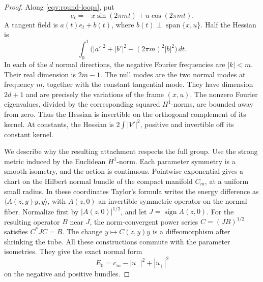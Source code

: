 \begin{proof}
Along \eqref{eqv:round-loops}, put
\[
 e_t=-x\sin(2\pi mt)+u\cos(2\pi mt).
\]
A tangent field is \(a(t)e_t+b(t)\), where
\(b(t)\perp\operatorname{span}\{x,u\}\).
Half the Hessian is
\begin{equation}
 \int_0^1\bigl(|a'|^2+|b'|^2-(2\pi m)^2|b|^2\bigr)\,dt.
 \label{eqv:round-hessian}
\end{equation}
In each of the \(d\) normal directions, the negative Fourier
frequencies are \(|k|<m\).  Their real dimension is \(2m-1\).
The null modes are the two normal modes at frequency \(m\), together
with the constant tangential mode.  They have dimension \(2d+1\)
and are precisely the variations of the frame \((x,u)\).
The nonzero Fourier eigenvalues, divided by the corresponding squared
\(H^1\)-norms, are bounded away from zero.  Thus the Hessian is
invertible on the orthogonal complement of its kernel.
At constants, the Hessian is \(2\int|V'|^2\), positive and invertible
off its constant kernel.

We describe why the resulting attachment respects the full group.
Use the strong metric induced by the Euclidean \(H^1\)-norm.
Each parameter symmetry is a smooth isometry, and the action is
continuous.  Pointwise exponential gives a chart on the Hilbert
normal bundle of the compact manifold \(C_m\), at a uniform small
radius.  In these coordinates Taylor's formula writes the energy
difference as \(\langle A(z,y)y,y\rangle\), with
\(A(z,0)\) an invertible symmetric operator on the normal fiber.
Normalize first by \(|A(z,0)|^{1/2}\), and let
\(J=\operatorname{sign}A(z,0)\).
For the resulting operator \(B\) near \(J\), the norm-convergent
power series \(C=(JB)^{1/2}\) satisfies \(C^*JC=B\).
The change \(y\mapsto C(z,y)y\) is a diffeomorphism after shrinking
the tube.  All these constructions commute with the parameter
isometries.  They give the exact normal form
\begin{equation}
 E_0=c_m-|u_-|^2+|u_+|^2
 \label{eqv:round-normal-form}
\end{equation}
on the negative and positive bundles.


\end{proof}
